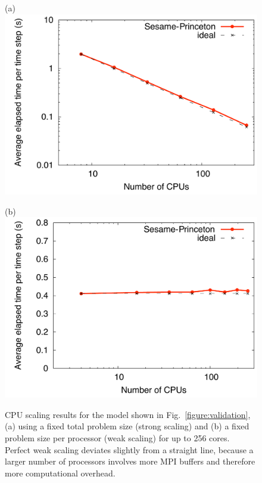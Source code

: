 \documentclass[referee,extra]{gji}
\begin{document}
\begin{figure}
\begin{center}
\begin{minipage}[t]{0.49\textwidth}
\begin{center}
(a) \\
\includegraphics[width=.9\textwidth]{./images/output_elapsed_time_strong.pdf}
\end{center}
\end{minipage}
\begin{minipage}[t]{0.49\textwidth}
\begin{center}
(b) \\
\includegraphics[width=.9\textwidth]{./images/output_elapsed_time_weak.pdf}
\end{center}
\end{minipage}
\end{center}
\caption{CPU scaling results for the model shown in Fig.~\ref{figure:validation}, (a) using a fixed total problem size (strong scaling) and (b) a fixed problem size per processor (weak scaling) for up to 256 cores.
Perfect weak scaling deviates slightly from a straight line,
because a larger number of processors involves more MPI buffers and therefore more computational overhead.
}
\label{figure:scaling}
\end{figure}
\end{document}
